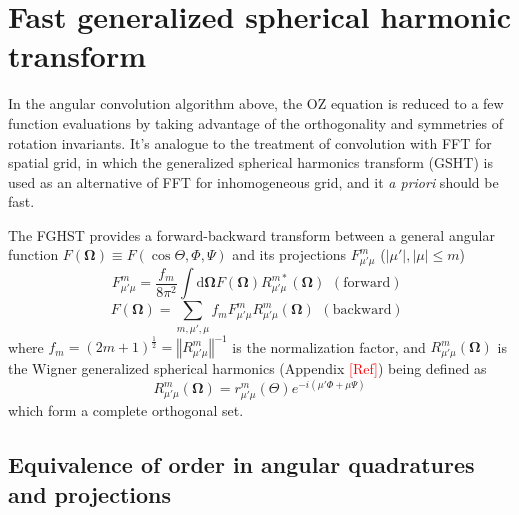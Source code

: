 \section{Fast generalized spherical harmonic transform}

In the angular convolution algorithm above, the OZ equation is reduced
to a few function evaluations by taking advantage of the orthogonality
and symmetries of rotation invariants. It's analogue to the treatment
of convolution with FFT for spatial grid, in which the generalized
spherical harmonics transform (GSHT) is used as an alternative of
FFT for inhomogeneous grid, and it \textit{a priori }should be fast.

The FGHST provides a forward-backward transform between a general
angular function $F(\mathbf{\Omega})\equiv F(\cos\Theta,\Phi,\Psi)$
and its projections $F_{\mu'\mu}^{m}$ ($\left|\mu'\right|,\left|\mu\right|\leq m$)
\begin{equation}
F_{\mu'\mu}^{m}=\frac{f_{m}}{8\pi^{2}}\int\mathrm{d}\mathbf{\Omega}F(\mathbf{\Omega})R_{\mu'\mu}^{m*}(\mathbf{\Omega})\begin{array}{c}
\mathrm{(forward)}\end{array}\label{eq:GSHT_forward}
\end{equation}
\begin{equation}
F(\mathbf{\Omega})=\sum_{m,\mu',\mu}f_{m}F_{\mu'\mu}^{m}R_{\mu'\mu}^{m}(\mathbf{\Omega})\begin{array}{c}
\mathrm{(backward)}\end{array}\label{eq:GSHT_backward}
\end{equation}
where $f_{m}=\left(2m+1\right)^{\frac{1}{2}}=\left\Vert R_{\mu'\mu}^{m}\right\Vert ^{-1}$
is the normalization factor, and $R_{\mu'\mu}^{m}(\mathbf{\Omega})$
is the Wigner generalized spherical harmonics (Appendix \textcolor{red}{{[}Ref{]}})
being defined as
\begin{equation}
R_{\mu'\mu}^{m}(\mathbf{\Omega})=r_{\mu'\mu}^{m}(\Theta)e^{-i(\mu'\Phi+\mu\Psi)}
\end{equation}
which form a complete orthogonal set.


\subsection{Equivalence of order in angular quadratures and projections}

